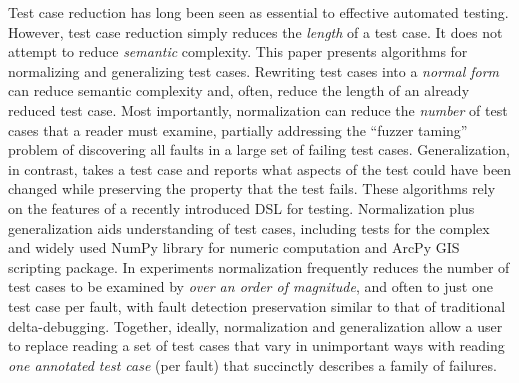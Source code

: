 Test case reduction has long been seen as essential to effective automated testing.  However, test case reduction simply reduces the \emph{length} of a test case.  It does not attempt to reduce \emph{semantic} complexity.  This paper presents algorithms for normalizing and generalizing test cases.  Rewriting test cases into a \emph{normal form} can reduce semantic complexity and, often, reduce the length of an already reduced test case.  Most importantly, normalization can reduce the \emph{number} of test cases that a reader must examine, partially addressing the ``fuzzer taming'' problem of discovering all faults in a large set of failing test cases.  Generalization, in contrast, takes a test case and reports what aspects of the test could have been changed while preserving the property that the test fails.  These algorithms rely on the features of a recently introduced DSL for testing.  Normalization plus generalization aids understanding of test cases, including tests for the complex and widely used NumPy library for numeric computation and ArcPy GIS scripting package.  In experiments normalization frequently reduces the number of test cases to be examined by \emph{over an order of magnitude}, and often to just one test case per fault, with fault detection preservation similar to that of traditional delta-debugging.  Together, ideally, normalization and generalization allow a user to replace reading a set of test cases that vary in unimportant ways with reading \emph{one annotated test case} (per fault) that succinctly describes a family of failures. 